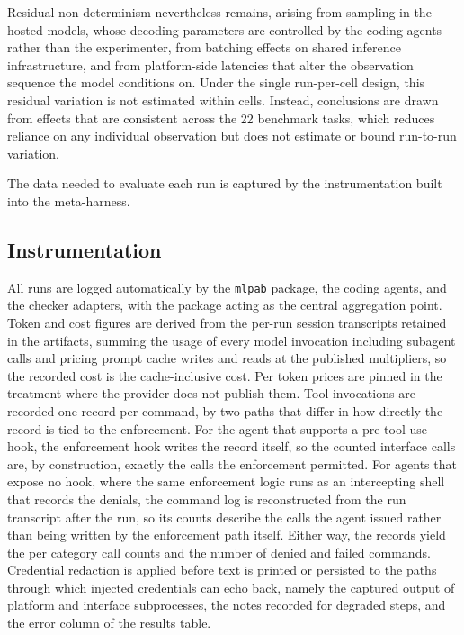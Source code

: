 \documentclass[
english,                 %
bibtex,                  %
]{kththesis}
\numberwithin{listing}{chapter}
\begin{document}
Residual non-determinism nevertheless remains, arising from sampling in the hosted models, whose decoding parameters are controlled by the coding agents rather than the experimenter, from batching effects on shared inference infrastructure, and from platform-side latencies that alter the observation sequence the model conditions on. Under the single run-per-cell design, this residual variation is not estimated within cells. Instead, conclusions are drawn from effects that are consistent across the 22 benchmark tasks, which reduces reliance on any individual observation but does not estimate or bound run-to-run variation.

The data needed to evaluate each run is captured by the instrumentation built into the meta-harness.

\subsection{Instrumentation}
\label{sec:method_instrumentation}
\glsresetall

All runs are logged automatically by the \texttt{mlpab} package, the coding agents, and the checker adapters, with the package acting as the central aggregation point. Token and cost figures are derived from the per-run session transcripts retained in the artifacts, summing the usage of every model invocation including subagent calls and pricing prompt cache writes and reads at the published multipliers, so the recorded cost is the cache-inclusive cost. Per token prices are pinned in the treatment where the provider does not publish them. Tool invocations are recorded one record per command, by two paths that differ in how directly the record is tied to the enforcement. For the agent that supports a pre-tool-use hook, the enforcement hook writes the record itself, so the counted interface calls are, by construction, exactly the calls the enforcement permitted. For agents that expose no hook, where the same enforcement logic runs as an intercepting shell that records the denials, the command log is reconstructed from the run transcript after the run, so its counts describe the calls the agent issued rather than being written by the enforcement path itself. Either way, the records yield the per category call counts and the number of denied and failed commands. Credential redaction is applied before text is printed or persisted to the paths through which injected credentials can echo back, namely the captured output of platform and interface subprocesses, the notes recorded for degraded steps, and the error column of the results table.
\end{document}
